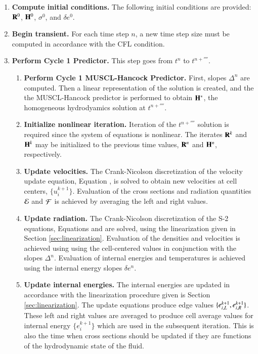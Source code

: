 \begin{enumerate}

\item \textbf{Compute initial conditions.} The following initial conditions
are provided: $\mathbf{R}^0$, $\mathbf{H}^0$, $\sigma^0$, and $\delta e^0$.

\item \textbf{Begin transient.} For each time step $n$, a new time step
size must be computed in accordance with the CFL condition.


\item \textbf{Perform Cycle 1 Predictor.} This step goes from
$t^n$ to $t^{n+\fourth}$.

\begin{enumerate}
\item \textbf{Perform Cycle 1 MUSCL-Hancock Predictor.} First, slopes $\Delta^n$ are
computed.
Then a linear representation of the solution is created, and the
the MUSCL-Hancock predictor is performed to obtain $\mathbf{H}^*$, the
homogeneous hydrodyamics solution at $t^{n+\fourth}$.

\item \textbf{Initialize nonlinear iteration.} Iteration of the
$t^{n+\fourth}$ solution is required since the system of equations
is nonlinear. The iterates $\mathbf{R}^k$ and $\mathbf{H}^k$ may be initialized
to the previous time
values, $\mathbf{R}^n$ and $\mathbf{H}^n$, respectively.

\item\label{item:vel_update}
\textbf{Update velocities.} The Crank-Nicolson discretization
of the velocity update equation, Equation ,
is solved to obtain new
velocities at cell centers, $\{u_i^{k+1}\}$. Evaluation of
the cross sections and radiation quantities $\mathcal{E}$ and $\mathcal{F}$
is achieved by averaging the left and right values.

\item \textbf{Update radiation.} The Crank-Nicolson discretization of the S-2
equations, Equations  and  are solved, using
the linearization given in Section \ref{sec:linearization}. Evaluation
of the densities and velocities is achieved using using the cell-centered values
in conjunction with the slopes $\Delta^n$. Evaluation of internal
energies and temperatures is achieved using the internal energy slopes
$\delta e^n$.

\item \textbf{Update internal energies.} The internal energies are
updated in accordance with the linearization procedure given is Section
\ref{sec:linearization}. The update equations produce edge values
$\{e^{k+1}_{i,L},e^{k+1}_{i,R}\}$. These left and right values are
averaged to produce cell average values for internal energy $\{e^{k+1}_i\}$
which are used in the subsequent iteration.
This is also the time when cross sections should be updated
if they are functions of the hydrodynamic state of the fluid.


\end{enumerate}
\end{enumerate}
